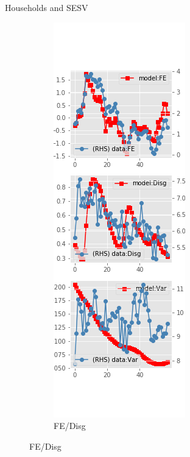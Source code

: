 \documentclass{beamer}
\begin{document}
\begin{frame}{Households and SESV}
\begin{figure}[ht]
\begin{subfigure}[b]{0.2\textwidth}
		\end{subfigure}
		\hfill
		\begin{subfigure}[b]{0.2\textwidth}
			\caption{FE/Disg}
			\includegraphics[width=\textwidth, height = 0.8\textheight]{figuresDraft/sce_se_est_sv_diag1.png}

\end{subfigure}
\end{figure}
\end{frame}
\end{document}
